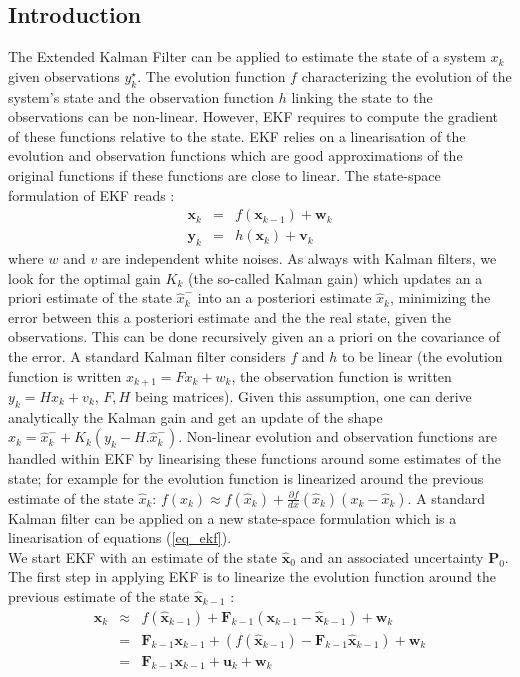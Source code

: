 \documentclass[10pt,oneside]{scrartcl}
\newcommand\vecteur[1]{\boldsymbol#1}
\newcommand\matrice[1]{\mathbf#1}
\begin{document}
\subsection{Introduction}
The Extended Kalman Filter can be applied to estimate the state of a system $x_k$ given observations $y^\star_k$. The evolution function $f$ characterizing the evolution of the system's state and the observation function $h$ linking the state to the observations can be non-linear. However, EKF requires to compute the gradient of these functions relative to the state. EKF relies on a linearisation of the evolution and observation functions which are good approximations of the original functions if these functions are close to linear. The state-space formulation of EKF reads :
\begin{eqnarray}
\nonumber \vecteur{x}_{k} &=& f(\vecteur{x_{k-1}}) + \vecteur{w_{k}}\\
\label{eq_ekf} \vecteur{y_{k}} &=& h(\vecteur{x_k}) + \vecteur{v_k}
\end{eqnarray}
where $w$ and $v$ are independent white noises. As always with Kalman
filters, we look for the optimal gain $K_k$ (the so-called Kalman
gain) which updates an a priori estimate of the state $\hat{x}^-_k$
into an a posteriori estimate $\hat{x}_k$, minimizing the error
between this a posteriori estimate and the the real state, given the
observations. This can be done recursively given an a priori on the
covariance of the error. A standard Kalman filter considers $f$ and
$h$ to be linear (the evolution function is written $x_{k+1} = F x_{k}
+ w_k$, the observation function is written $y_{k} = H x_k + v_k$,
$F,H$ being matrices). Given this assumption, one can derive
analytically the Kalman gain and get an update of the shape $\hat{x}_k
= \hat{x}^-_k + K_k (y_k - H.\hat{x}^-_k)$. Non-linear evolution and
observation functions are handled within EKF by linearising these
functions around some estimates of the state; for example for the
evolution function is linearized around the previous estimate of the
state $\hat{x}_k$: $f(x_k) \approx f(\hat{x}_k) + \frac{\partial f}{dx}(\hat{x}_k) (x_k - \hat{x}_k)$. A standard Kalman filter can be applied on a new state-space formulation which is a linearisation of equations (\ref{eq_ekf}).\\

We start EKF with an estimate of the state $\hat{\vecteur{x}}_{0}$ and an associated
uncertainty $\matrice{P_0}$. The first step in applying EKF is to
linearize the evolution function around the previous estimate of the
state $\hat{\vecteur{x}}_{k-1}$ :
\begin{eqnarray}
\nonumber \vecteur{x}_{k} &\approx& f(\hat{\vecteur{x}}_{k-1}) +
\matrice{F}_{k-1} (\vecteur{x_{k-1}} - \hat{\vecteur{x}}_{k-1}) +
\vecteur{w_{k}}\\
&=& \matrice{F}_{k-1} \vecteur{x}_{k-1} + (f(\hat{\vecteur{x}}_{k-1}) -
\matrice{F}_{k-1}  \hat{\vecteur{x}}_{k-1}) + \vecteur{w}_{k} \\
\label{eq_ekf_linear_evolution}&=& \matrice{F}_{k-1} \vecteur{x}_{k-1} + \vecteur{u}_k + \vecteur{w}_{k}
\end{eqnarray}
\end{document}
